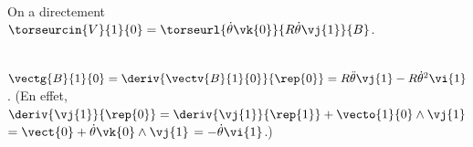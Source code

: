 \ifprof ~\\
On a directement $\torseurcin{V}{1}{0} = \torseurl{\dot{\theta}\vk{0}}{R\dot{\theta}\vj{1}}{B}$.
\else
\fi

\ifprof ~\\
 $\vectg{B}{1}{0} = \deriv{\vectv{B}{1}{0}}{\rep{0}}=R\ddot{\theta}\vj{1}-R\dot{\theta}^2\vi{1}$.
(En effet,  $\deriv{\vj{1}}{\rep{0}} = \deriv{\vj{1}}{\rep{1}} + \vecto{1}{0}\wedge \vj{1} $ $=\vect{0}+\dot{\theta}\vk{0}\wedge \vj{1}$ $=-\dot{\theta}\vi{1}$.)
 
\else
\fi

